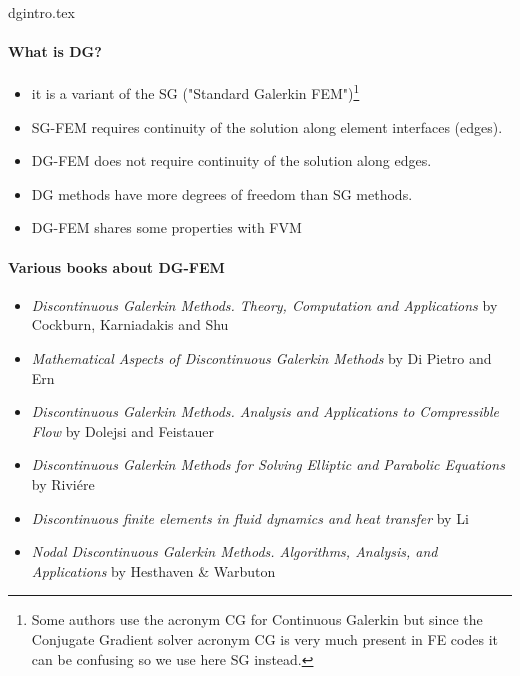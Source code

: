 \begin{flushright} {\tiny {\color{gray} dgintro.tex}} \end{flushright}

\paragraph{What is DG?}

\begin{itemize}
\item it is a variant of the SG ("Standard Galerkin FEM")\footnote{Some authors use the acronym 
CG for Continuous Galerkin but since the Conjugate Gradient solver acronym CG is very much present in FE codes it can 
be confusing so we use here SG instead.}
\item SG-FEM requires continuity of the solution along element interfaces (edges).
\item DG-FEM does not require continuity of the solution along edges.
\item DG methods have more degrees of freedom than SG methods.
\item DG-FEM shares some properties with FVM
\end{itemize}

\paragraph{Various books about DG-FEM}

\begin{itemize}
\item {\it Discontinuous Galerkin Methods. Theory, Computation and Applications} by
Cockburn, Karniadakis and Shu \cite{cockburn00}
\item {\it Mathematical Aspects of Discontinuous Galerkin Methods} by Di Pietro and Ern 
\cite{dipietro_ern12}
\item {\it Discontinuous Galerkin Methods. Analysis and Applications to Compressible Flow} by 
Dolejsi and Feistauer \cite{dolejsi_feistauer15}
\item {\it Discontinuous Galerkin Methods for Solving Elliptic and Parabolic Equations} by Rivi{\'e}re
\cite{riviere08}
\item {\it Discontinuous finite elements in fluid dynamics and heat transfer} by Li \cite{li06}
\item {\it Nodal Discontinuous Galerkin Methods. Algorithms, Analysis, and Applications} by 
Hesthaven \& Warbuton \cite{hewa08}
\end{itemize}

